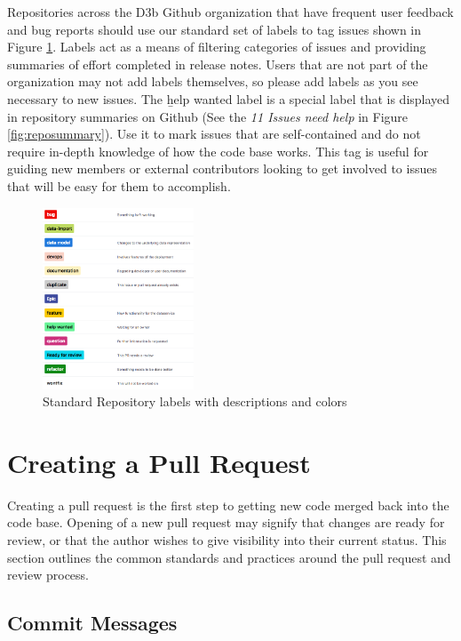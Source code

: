 \documentclass[a4paper,12pt,titlepage]{scrartcl}
\begin{document}
	Repositories across the D3b Github organization that have frequent user feedback and bug reports should use our standard set of labels to tag issues shown in Figure \ref{fig:labels}.
	Labels act as a means of filtering categories of issues and providing summaries of effort completed in release notes.
	Users that are not part of the organization may not add labels themselves, so please add labels as you see necessary to new issues.
	The {\b help wanted} label is a special label that is displayed in repository summaries on Github (See the {\em 11 Issues need help} in Figure \ref{fig:reposummary}).
	Use it to mark issues that are self-contained and do not require in-depth knowledge of how the code base works.
	This tag is useful for guiding new members or external contributors looking to get involved to issues that will be easy for them to accomplish.
   
  	\begin{figure}[h]
  			\centering
    			\includegraphics[width=0.4\textwidth]{images/labels.png}
    			\caption{Standard Repository labels with descriptions and colors}
    			\label{fig:labels}
   	\end{figure}
   
	\section{Creating a Pull Request}
	
	Creating a pull request is the first step to getting new code merged back into the code base.
	Opening of a new pull request may signify that changes are ready for review, or that the author wishes to give visibility into their current status.
	This section outlines the common standards and practices around the pull request and review process.
	
	\subsection{Commit Messages}\label{commits}
	
\end{document}

